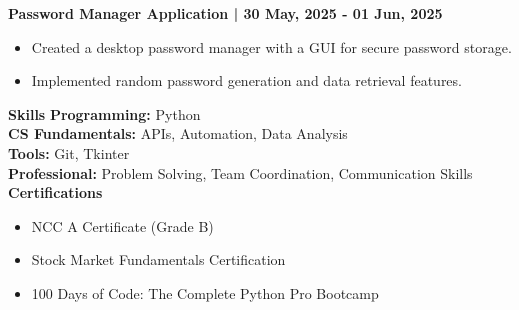 \documentclass[10pt]{article}
\begin{document}
\textbf{Password Manager Application | 30 May, 2025 - 01 Jun, 2025}
\begin{itemize}
\item Created a desktop password manager with a GUI for secure password storage.
\item Implemented random password generation and data retrieval features.
\end{itemize}

\textbf{Skills}
\textbf{Programming:} Python\\
\textbf{CS Fundamentals:} APIs, Automation, Data Analysis\\
\textbf{Tools:} Git, Tkinter\\
\textbf{Professional:} Problem Solving, Team Coordination, Communication Skills\\

\textbf{Certifications}
\begin{itemize}
\item NCC A Certificate (Grade B)
\item Stock Market Fundamentals Certification
\item 100 Days of Code: The Complete Python Pro Bootcamp
\end{itemize}
\end{document}
